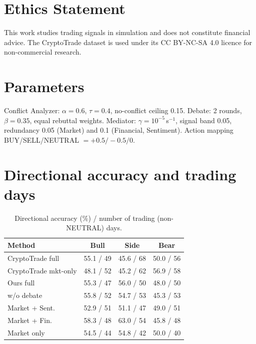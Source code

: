 \documentclass[11pt]{article}
\begin{document}
\section*{Ethics Statement}
This work studies trading signals in simulation and does not constitute financial advice. The CryptoTrade dataset is used
under its CC BY-NC-SA 4.0 licence for non-commercial research.



\appendix
\section{Parameters}
\label{app:params}
Conflict Analyzer: $\alpha=0.6$, $\tau=0.4$, no-conflict ceiling 0.15. Debate: 2 rounds, $\beta=0.35$, equal rebuttal
weights. Mediator: $\gamma=10^{-5}$\,s$^{-1}$, signal band 0.05, redundancy 0.05 (Market) and 0.1 (Financial,
Sentiment). Action mapping BUY/SELL/NEUTRAL $=+0.5/-0.5/0$.

\section{Directional accuracy and trading days}
\begin{table}[h]
\centering
\small
\setlength{\tabcolsep}{3pt}
\begin{tabular}{lccc}
\toprule
Method & Bull & Side & Bear \\
\midrule
CryptoTrade full & 55.1 / 49 & 45.6 / 68 & 50.0 / 56 \\
CryptoTrade mkt-only & 48.1 / 52 & 45.2 / 62 & 56.9 / 58 \\
Ours full & 55.3 / 47 & 56.0 / 50 & 48.0 / 50 \\
\quad w/o debate & 55.8 / 52 & 54.7 / 53 & 45.3 / 53 \\
\quad Market + Sent. & 52.9 / 51 & 51.1 / 47 & 49.0 / 51 \\
\quad Market + Fin. & 58.3 / 48 & 63.0 / 54 & 45.8 / 48 \\
\quad Market only & 54.5 / 44 & 54.8 / 42 & 50.0 / 40 \\
\bottomrule
\end{tabular}
\caption{Directional accuracy (\%) / number of trading (non-NEUTRAL) days.}
\end{table}
\end{document}
